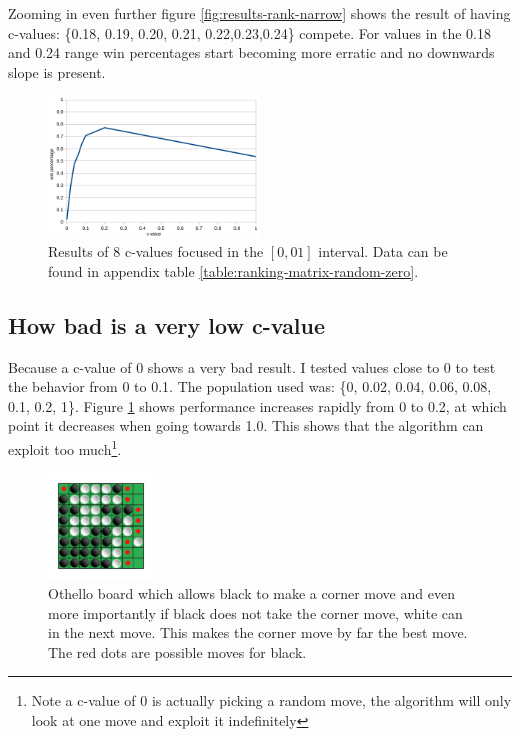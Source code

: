 \documentclass[11pt,a4paper]{article}
\begin{document}
Zooming in even further figure \ref{fig:results-rank-narrow} shows the result of having c-values: \{0.18, 0.19, 0.20, 0.21, 0.22,0.23,0.24\} compete. For values in the 0.18 and 0.24 range win percentages start becoming more erratic and no downwards slope is present.

\begin{figure}[t]	
	\centering
	\includegraphics[width=0.5\textwidth]{images/rank-0-01}
	\caption{Results of 8 c-values focused in the $[0,01]$ interval. Data can be found in appendix table \ref{table:ranking-matrix-random-zero}.}
	\label{fig:results-rank-0-01}
\end{figure}
\vfill
\subsection{How bad is a very low c-value}
Because a c-value of 0 shows a very bad result. I tested values close to 0 to test the behavior from 0 to 0.1. The population used was: \{0, 0.02, 0.04, 0.06, 0.08, 0.1, 0.2, 1\}. Figure \ref{fig:results-rank-0-01} shows performance increases rapidly from 0 to 0.2, at which point it decreases when going towards 1.0. This shows that the algorithm can exploit 
too much\footnote{Note a c-value of 0 is actually picking a random move, the algorithm will only look at one move and exploit it indefinitely}.

\begin{figure}
	\centering
	\includegraphics[width=0.25\textwidth]{images/corner-board}
	\caption{Othello board which allows black to make a corner move and even more importantly if black does not take the corner move, white can in the next move. This makes the corner move by far the best move. The red dots are possible moves for black.}
	\label{fig:othello-corner-board}
\end{figure}
\end{document}
